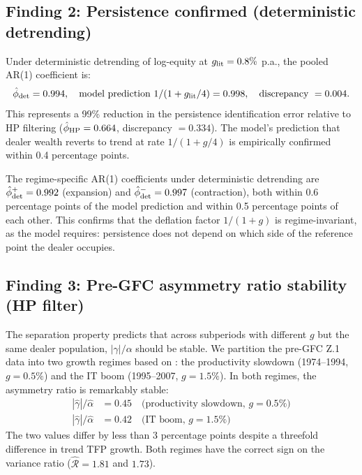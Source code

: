 \documentclass[12pt,a4paper]{article}
\theoremstyle{definition}
\begin{document}
\subsection{Finding 2: Persistence confirmed (deterministic detrending)}
\label{sec:finding2}

Under deterministic detrending of log-equity at $g_{\rm lit} = 0.8\%$
p.a., the pooled AR(1) coefficient is:
\begin{equation}
  \hat{\phi}_{\rm det} = 0.994, \quad
  \text{model prediction } 1/(1+g_{\rm lit}/4) = 0.998, \quad
  \text{discrepancy } = 0.004.
  \label{eq:phi_det}
\end{equation}
This represents a 99\% reduction in the persistence identification
error relative to HP filtering ($\hat{\phi}_{\rm HP} = 0.664$,
discrepancy $= 0.334$). The model's prediction that dealer wealth
reverts to trend at rate $1/(1+g/4)$ is empirically confirmed within
0.4 percentage points.

The regime-specific AR(1) coefficients under deterministic detrending
are $\hat{\phi}^+_{\rm det} = 0.992$ (expansion) and
$\hat{\phi}^-_{\rm det} = 0.997$ (contraction), both within 0.6
percentage points of the model prediction and within 0.5 percentage
points of each other. This confirms that the deflation factor $1/(1+g)$
is regime-invariant, as the model requires: persistence does not depend
on which side of the reference point the dealer occupies.

\subsection{Finding 3: Pre-GFC asymmetry ratio stability (HP filter)}
\label{sec:finding3}

The separation property predicts that across subperiods with different
$g$ but the same dealer population, $|\gamma|/\alpha$ should be stable.
We partition the pre-GFC Z.1 data into two growth regimes based on
\citet{fernald2015}: the productivity slowdown (1974--1994,
$g = 0.5\%$) and the IT boom (1995--2007, $g = 1.5\%$). In both
regimes, the asymmetry ratio is remarkably stable:
\begin{align}
  |\hat{\gamma}|/\hat{\alpha}
    &= 0.45 \quad \text{(productivity slowdown, } g = 0.5\%) \nonumber \\
  |\hat{\gamma}|/\hat{\alpha}
    &= 0.42 \quad \text{(IT boom, } g = 1.5\%)
  \label{eq:asym_stability}
\end{align}
The two values differ by less than 3 percentage points despite a
threefold difference in trend TFP growth. Both regimes have the correct
sign on the variance ratio ($\hat{\mathcal{R}} = 1.81$ and $1.73$).
\end{document}
